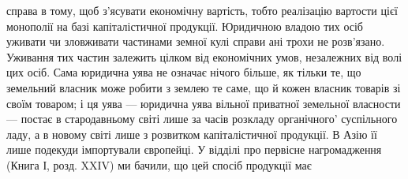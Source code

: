 справа в тому, щоб з’ясувати економічну вартість, тобто реалізацію вартости
цієї монополії на базі капіталістичної продукції. Юридичною владою тих осіб
уживати чи зловживати частинами земної кулі справи ані трохи не розв’язано.
Уживання тих частин залежить цілком від економічних умов, незалежних від
волі цих осіб. Сама юридична уява не означає нічого більше, як тільки те, що
земельний власник може робити з землею те саме, що й кожен власник
товарів зі своїм товаром; і ця уява — юридична уява вільної приватної земельної
власности — постає в стародавньому світі лише за часів розкладу органічного'
суспільного ладу, а в новому світі лише з розвитком капіталістичної продукції.
В Азію її лише подекуди імпортували європейці. У відділі про первісне нагромадження
(Книга І, розд. XXIV) ми бачили, що цей спосіб продукції має
\parbreak{}  %
